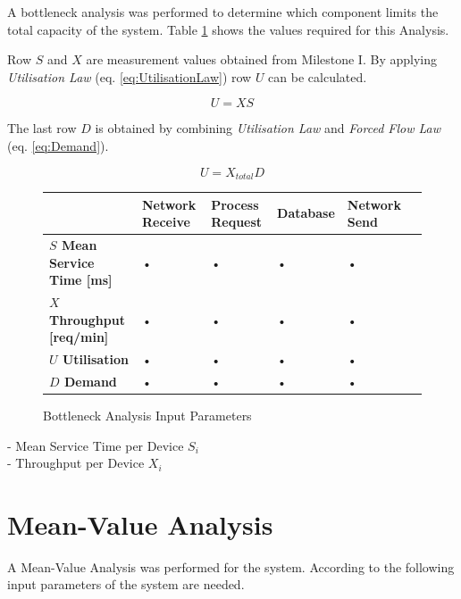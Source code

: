 \documentclass[a4paper]{article}
\begin{document}
A bottleneck analysis was performed to determine which component limits the total capacity of the system. Table \ref{tabular:BottleneckParams} shows the values required for this Analysis.

Row $S$ and $X$ are measurement values obtained from Milestone I. By applying \textit{Utilisation Law} (eq. \ref{eq:UtilisationLaw}) row $U$ can be calculated.   

\begin{equation}
\label{eq:UtilisationLaw}
U = X S
\end{equation}


The last row $D$ is obtained by combining \textit{Utilisation Law} and \textit{Forced Flow Law} (eq. \ref{eq:Demand}). 

\begin{equation}
\label{eq:Demand}
U = X_{total} D
\end{equation}


\begin{figure}[H]
\label{tabular:BottleneckParams}
\begin{center}
\begin{tabular}{|l|l|l|l|l|l|}
\hline 
 & \textbf{Network Receive} & \textbf{Process Request} & \textbf{Database} & \textbf{Network Send}\\ 
\hline
\textbf{$S$ Mean Service Time [ms]} & • & • & • & • \\
\hline 
\textbf{$X$ Throughput [req/min]} & • & • & • & • \\
\hline
\textbf{$U$ Utilisation} & • & • & • & • \\
\hline
\textbf{$D$ Demand} & • & • & • & • \\
\hline
\end{tabular} 
\caption{Bottleneck Analysis Input Parameters}
\end{center}
\end{figure}


- Mean Service Time per Device $S_i$\\
- Throughput per Device $X_i$


\section{Mean-Value Analysis}

A Mean-Value Analysis was performed for the system. According to \cite[Box 31.2]{Raj} the following input parameters of the system are needed.
\end{document}
